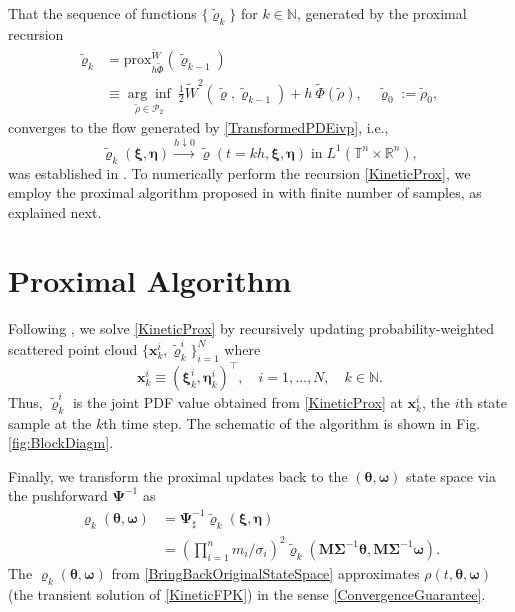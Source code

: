 \documentclass[10pt,twocolumn]{IEEEtran}
\begin{document}
That the sequence of functions $\{\tilde{\varrho}_{k}\}$ for $k\in\mathbb{N}$, generated by the proximal recursion
\begin{align}
\tilde{\varrho}_{k} &= {\text{prox}}^{\widetilde{W}}_{h\widetilde{\Phi}}(\tilde{\varrho}_{k-1}) \nonumber\\
&\equiv \underset{\tilde{\rho}\in\mathcal{P}_{2}}{\arg\inf}\:\frac{1}{2}\widetilde{W}^{2}\left(\tilde{\varrho},\tilde{\varrho}_{k-1}\right) + h\:\widetilde{\Phi}(\tilde{\rho}), \quad \tilde{\varrho}_{0} := \tilde{\rho}_{0},
\label{KineticProx}	
\end{align}
converges to the flow generated by \eqref{TransformedPDEivp}, i.e., 
$$\tilde{\varrho}_{k}(\bm{\xi},\bm{\eta}) \xrightarrow{h\downarrow 0} \tilde{\varrho}(t=kh,\bm{\xi},\bm{\eta})\;\text{in}\;L^{1}\left(\mathbb{T}^{n}\times\mathbb{R}^{n}\right),$$
was established in \cite{duong2014conservative}. To numerically perform the recursion \eqref{KineticProx}, we employ the proximal algorithm proposed in \cite{caluya2019TAC} with finite number of samples, as explained next.







\section{Proximal Algorithm}\label{sec:ProxAlgo}
Following \cite{caluya2019TAC}, we solve \eqref{KineticProx} by recursively updating probability-weighted scattered point cloud $\{\bm{x}_{k}^{i},\tilde{\varrho}_{k}^{i}\}_{i=1}^{N}$ where 
$$\bm{x}_{k}^{i}\equiv\left(\bm{\xi}_{k}^{i},\bm{\eta}_{k}^{i}\right)^{\!\top}, \quad i=1,\hdots,N, \quad k\in\mathbb{N}.$$
Thus, $\tilde{\varrho}_{k}^{i}$ is the joint PDF value obtained from \eqref{KineticProx} at $\bm{x}_{k}^{i}$, the $i$th state sample at the $k$th time step. The schematic of the algorithm is shown in Fig. \ref{fig:BlockDiagm}. 

Finally, we transform the proximal updates back to the $\left(\bm{\theta},\bm{\omega}\right)$ state space via the pushforward $\bm{\Psi}^{-1}$ as
\begin{align}
\varrho_{k}\left(\bm{\theta},\bm{\omega}\right) &= \bm{\Psi}^{-1}_{\sharp} \tilde{\varrho}_{k}\left(\bm{\xi},\bm{\eta}\right) \nonumber\\
&= \left(\prod_{i=1}^{n}m_{i}/\sigma_{i}\right)^{\!\!2}\tilde{\varrho}_{k}\left(\bm{M}\bm{\Sigma}^{-1}\bm{\theta},\bm{M}\bm{\Sigma}^{-1}\bm{\omega}\right).
\label{BringBackOriginalStateSpace}	
\end{align}
The $\varrho_{k}\left(\bm{\theta},\bm{\omega}\right)$ from \eqref{BringBackOriginalStateSpace} approximates $\rho(t,\bm{\theta},\bm{\omega})$ (the transient solution of \eqref{KineticFPK}) in the sense \eqref{ConvergenceGuarantee}.
\end{document}
